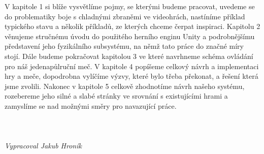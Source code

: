 V kapitole 1 si blíže vysvětlíme pojmy, se kterými budeme pracovat, uvedeme se do problematiky boje s chladnými zbraněmi ve videohrách, nastíníme příklad typického stavu a několik příkladů, ze kterých chceme čerpat inspiraci. Kapitolu 2 věnujeme stručnému úvodu do použitého herního enginu Unity a podrobnějšímu představení jeho fyzikálního subsystému, na němž tato práce do značné míry stojí. Dále budeme pokračovat kapitolou 3 ve které navrhneme schéma ovládání pro náš jedenapůlruční meč. V kapitole 4 popíšeme celkový návrh a implementaci hry a meče, dopodrobna vylíčíme výzvy, které bylo třeba překonat, a řešení která jsme zvolili. Nakonec v kapitole 5 celkově zhodnotíme návrh našeho systému, rozebereme jeho silné a slabé stránky ve srovnání s existujícími hrami a zamyslíme se nad možnými směry pro navazující práce.
\\
\\
\\
\\
\textit{Vypracoval Jakub Hroník}